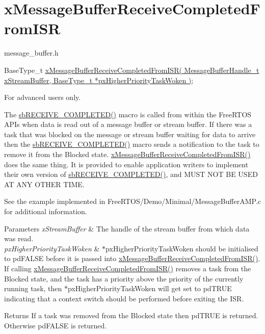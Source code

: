 \hypertarget{group__xMessageBufferReceiveCompletedFromISR}{}\section{x\+Message\+Buffer\+Receive\+Completed\+From\+I\+SR}
\label{group__xMessageBufferReceiveCompletedFromISR}
message\+\_\+buffer.\+h


\begin{DoxyPre}
BaseType\_t \hyperlink{message__buffer_8h_a22b1a37d0d4f39acd87250f73d9aab0c}{xMessageBufferReceiveCompletedFromISR( MessageBufferHandle\_t xStreamBuffer, BaseType\_t *pxHigherPriorityTaskWoken )};
\end{DoxyPre}


For advanced users only.

The \hyperlink{stream__buffer_8c_a4d6a29d283acfa2d4ef576476eedc789}{sb\+R\+E\+C\+E\+I\+V\+E\+\_\+\+C\+O\+M\+P\+L\+E\+T\+E\+D()} macro is called from within the Free\+R\+T\+OS A\+P\+Is when data is read out of a message buffer or stream buffer. If there was a task that was blocked on the message or stream buffer waiting for data to arrive then the \hyperlink{stream__buffer_8c_a4d6a29d283acfa2d4ef576476eedc789}{sb\+R\+E\+C\+E\+I\+V\+E\+\_\+\+C\+O\+M\+P\+L\+E\+T\+E\+D()} macro sends a notification to the task to remove it from the Blocked state. \hyperlink{message__buffer_8h_a22b1a37d0d4f39acd87250f73d9aab0c}{x\+Message\+Buffer\+Receive\+Completed\+From\+I\+S\+R()} does the same thing. It is provided to enable application writers to implement their own version of \hyperlink{stream__buffer_8c_a4d6a29d283acfa2d4ef576476eedc789}{sb\+R\+E\+C\+E\+I\+V\+E\+\_\+\+C\+O\+M\+P\+L\+E\+T\+E\+D()}, and M\+U\+ST N\+OT BE U\+S\+ED AT A\+NY O\+T\+H\+ER T\+I\+ME.

See the example implemented in Free\+R\+T\+O\+S/\+Demo/\+Minimal/\+Message\+Buffer\+A\+M\+P.\+c for additional information.


\begin{DoxyParams}{Parameters}
{\em x\+Stream\+Buffer} & The handle of the stream buffer from which data was read.\\
\hline
{\em px\+Higher\+Priority\+Task\+Woken} & $\ast$px\+Higher\+Priority\+Task\+Woken should be initialised to pd\+F\+A\+L\+SE before it is passed into \hyperlink{message__buffer_8h_a22b1a37d0d4f39acd87250f73d9aab0c}{x\+Message\+Buffer\+Receive\+Completed\+From\+I\+S\+R()}. If calling \hyperlink{message__buffer_8h_a22b1a37d0d4f39acd87250f73d9aab0c}{x\+Message\+Buffer\+Receive\+Completed\+From\+I\+S\+R()} removes a task from the Blocked state, and the task has a priority above the priority of the currently running task, then $\ast$px\+Higher\+Priority\+Task\+Woken will get set to pd\+T\+R\+UE indicating that a context switch should be performed before exiting the I\+SR.\\
\hline
\end{DoxyParams}
\begin{DoxyReturn}{Returns}
If a task was removed from the Blocked state then pd\+T\+R\+UE is returned. Otherwise pd\+F\+A\+L\+SE is returned. 
\end{DoxyReturn}
